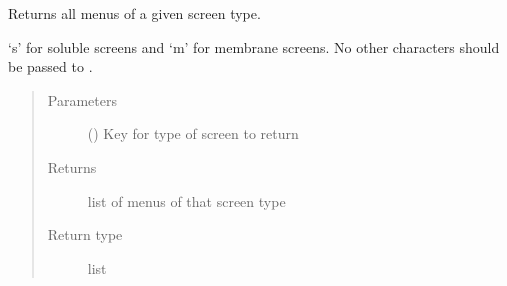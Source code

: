 \documentclass[letterpaper,10pt,english]{sphinxmanual}
\begin{document}
\begin{fulllineitems}
\begin{fulllineitems}
\begin{quote}
\begin{description}
\end{description}\end{quote}

\end{fulllineitems}


\begin{fulllineitems}
\label{\detokenize{polo.utils:polo.utils.io_utils.BarTender.get_menus_by_type}}
Returns all menus of a given screen type.

‘s’ for soluble screens and ‘m’ for membrane screens. No other
characters should be passed to .
\begin{quote}\begin{description}
\item[{Parameters}] \leavevmode
{} (\sphinxstyleliteralemphasis{\sphinxupquote{ (}}\sphinxstyleliteralemphasis{\sphinxupquote{)}}) \textendash{} Key for type of screen to return

\item[{Returns}] \leavevmode
list of menus of that screen type

\item[{Return type}] \leavevmode
list

\end{description}\end{quote}

\end{fulllineitems}


\end{fulllineitems}

\end{document}
